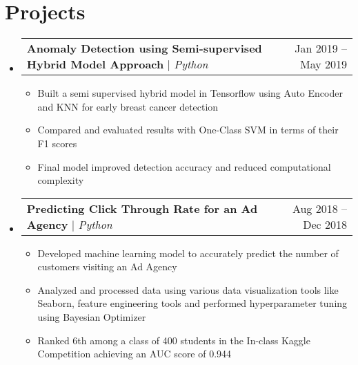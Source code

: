 \documentclass[letterpaper,11pt]{article}
\makeatletter
\newcommand{\resumeItem}[1]{
  \item\small{
    {#1 \vspace{-2pt}}
  }
}
\newcommand{\resumeProjectHeading}[2]{
    \item
    \begin{tabular*}{0.97\textwidth}{l@{\extracolsep{\fill}}r}
      \small#1 & #2 \\
    \end{tabular*}\vspace{-7pt}
}
\newcommand{\resumeSubHeadingListStart}{\begin{itemize}[leftmargin=0.15in, label={}]}
\newcommand{\resumeSubHeadingListEnd}{\end{itemize}}
\newcommand{\resumeItemListStart}{\begin{itemize}}
\newcommand{\resumeItemListEnd}{\end{itemize}\vspace{-5pt}}
\makeatother
\begin{document}
\section{Projects}
    \resumeSubHeadingListStart
      \resumeProjectHeading
          {\textbf{Anomaly Detection using Semi-supervised Hybrid Model Approach} $|$ \emph{Python}}{Jan 2019 -- May 2019}
          \resumeItemListStart
            \resumeItem{Built a semi supervised hybrid model in Tensorflow using Auto Encoder and KNN for early breast cancer detection}
            \resumeItem{Compared and evaluated results with One-Class SVM in terms of their F1 scores}
            \resumeItem{Final model improved detection accuracy and reduced computational complexity}
          \resumeItemListEnd
      \resumeProjectHeading
          {\textbf{Predicting Click Through Rate for an Ad Agency} $|$ \emph{Python}}{Aug 2018 -- Dec 2018}
          \resumeItemListStart
            \resumeItem{Developed machine learning model to accurately predict the number of customers visiting an Ad Agency}
            \resumeItem{Analyzed and processed data using various data visualization tools like Seaborn, feature engineering tools
and performed hyperparameter tuning using Bayesian Optimizer}
            \resumeItem{Ranked 6th among a class of 400 students in the In-class Kaggle Competition achieving an AUC score of 0.944}
          \resumeItemListEnd
    \resumeSubHeadingListEnd



%
\end{document}
